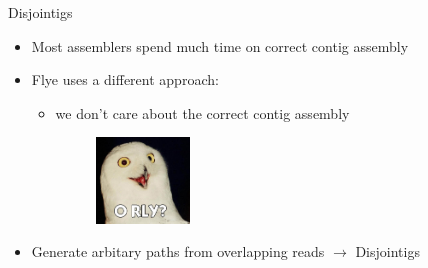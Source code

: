\documentclass{beamer}
\begin{document}
  \begin{frame}{Disjointigs}
    \begin{itemize}[<+- | alert@+>]
      \item Most assemblers spend much time on correct contig assembly

      \item Flye uses a different approach:
      
      \begin{itemize}[<+- | alert@+>]
        \item we don't care about the correct contig assembly
        \begin{description}
        \end{description}
        \begin{figure}
          \includegraphics[width=2.5cm]{presentation/images/orly-owl.jpg}
          \label{fig:orly}
        \end{figure}
        
      \end{itemize}
      
      \item Generate arbitary paths from overlapping reads $\rightarrow$ Disjointigs
    \end{itemize}
  \end{frame}
\end{document}
